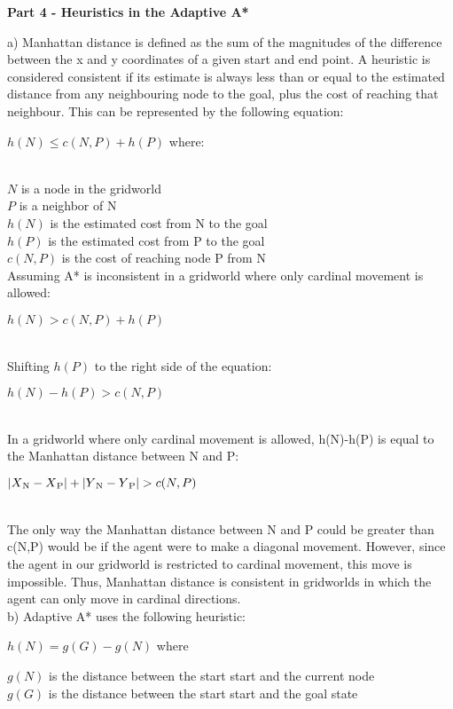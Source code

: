 \documentclass[11pt]{article}
\begin{document}
    \begin{center}
        \Large
        \textbf{Part 4 - Heuristics in the Adaptive A*}
    \end{center}
    a) Manhattan distance is defined as the sum of the magnitudes of the difference between the x and y coordinates of a given start and end point. A heuristic is considered consistent if its estimate is always less than or equal to the estimated distance from any neighbouring node to the goal, plus the cost of reaching that neighbour. This can be represented by the following equation:\\
    \centerline{$h(N) \le c(N, P) + h(P)$ where:} \\
    $N$ is a node in the gridworld \\
    $P$ is a neighbor of N\\
    $h(N)$ is the estimated cost from N to the goal\\
    $h(P)$ is the estimated cost from P to the goal\\
    $c(N,P)$ is the cost of reaching node P from N\\
    
    Assuming A* is inconsistent in a gridworld where only cardinal movement is allowed:\\
    \centerline{$h(N) > c(N, P) + h(P)$}\\
    
    Shifting $h(P)$ to the right side of the equation:\\
    \centerline{$h(N) - h(P) > c(N, P)$}\\
    
    In a gridworld where only cardinal movement is allowed, h(N)-h(P) is equal to the Manhattan distance between N and P:\\
    \centerline{$|X\textsubscript{N}-X\textsubscript{P}| + |Y\textsubscript{N}-Y\textsubscript{P}| > c(N, P)$}\\
    
    The only way the Manhattan distance between N and P could be greater than c(N,P) would be if the agent were to make a diagonal movement. However, since the agent in our gridworld is restricted to cardinal movement, this move is impossible. Thus, Manhattan distance is consistent in gridworlds in which the agent can only move in cardinal directions.\\

    b) Adaptive A* uses the following heuristic:\\
    \centerline{$h(N) = g(G) - g(N)$ where}
    $g(N)$ is the distance between the start start and the current node\\
    $g(G)$ is the distance between the start start and the goal state\\
    
\end{document}
